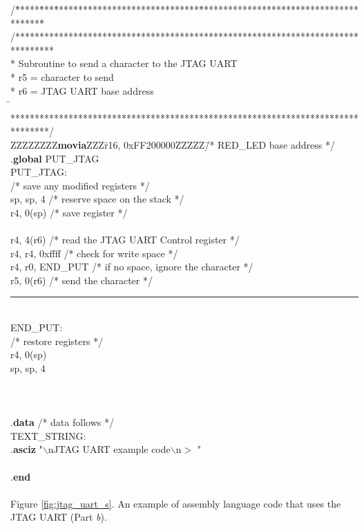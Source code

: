 \begin{center}
\begin{minipage}[t]{12.5 cm}
\begin{tabbing}
/\=*****\=***\=******************************\=****************************************\=\kill
/********************************************************************************\\
\>* Subroutine to send a character to the JTAG UART\\
\>* \>r5 \>= character to send\\
\>* \>r6 \>= JTAG UART base address\\
\=\kill
\>********************************************************************************/\\
ZZZZZZZZ\={\bf movia}ZZZ\=r16, 0xFF200000ZZZZZ\=/* RED\_LED base address */\kill
\>.{\bf global} \>PUT\_JTAG\\
PUT\_JTAG:\\
\>/* save any modified registers */\\
 \>sp, sp, 4 \>/* reserve space on the stack */\\
 \>r4, 0(sp) \>/* save register */\\
\\
 \>r4, 4(r6) \>/* read the JTAG UART Control register */\\
 \>r4, r4, 0xffff \>/* check for write space */\\
 \>r4, r0, END\_PUT \>/* if no space, ignore the character */\\
 \>r5, 0(r6) \>/* send the character */\\
\rule{6.0in}{0in}~\\
END\_PUT:\\
\>/* restore registers */\\
 \>r4, 0(sp)\\
 \>sp, sp, 4\\
\\
\\
\\
\>.{\bf data} \>\>/* data follows */\\
TEXT\_STRING:\\
\>.{\bf asciz} "$\backslash$nJTAG UART example code$\backslash$n$>$ "\\
\\
\>.{\bf end}\\
~\\
Figure \ref{fig:jtag_uart_s}. An example of assembly language code that uses the JTAG
UART (Part {\it b}).
\end{tabbing}
\end{minipage}
\end{center}